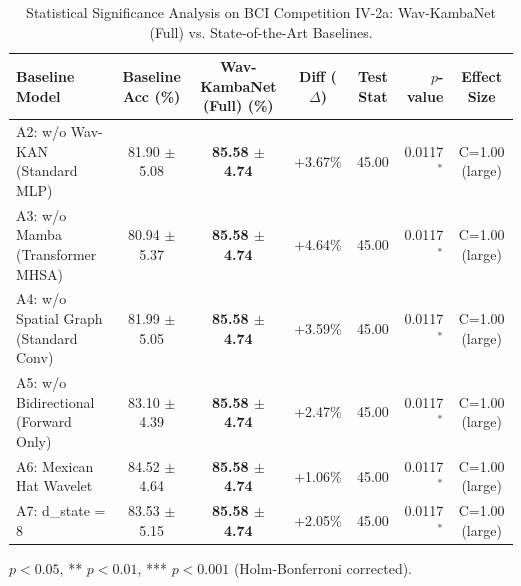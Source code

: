 \begin{table}[t]
\centering
\small
\caption{Statistical Significance Analysis on BCI Competition IV-2a: Wav-KambaNet (Full) vs. State-of-the-Art Baselines.}
\label{tab:stat_analysis}
\begin{tabular}{lccccrc}
\toprule
\textbf{Baseline Model} & \textbf{Baseline Acc (\%)} & \textbf{Wav-KambaNet (Full) (\%)} & \textbf{Diff ($\Delta$)} & \textbf{Test Stat} & \textbf{$p$-value} & \textbf{Effect Size} \\
\midrule
A2: w/o Wav-KAN (Standard MLP) & 81.90 $\pm$ 5.08 & \textbf{85.58 $\pm$ 4.74} & +3.67\% & 45.00 & 0.0117$^{*}$ & C=1.00 (large) \\
A3: w/o Mamba (Transformer MHSA) & 80.94 $\pm$ 5.37 & \textbf{85.58 $\pm$ 4.74} & +4.64\% & 45.00 & 0.0117$^{*}$ & C=1.00 (large) \\
A4: w/o Spatial Graph (Standard Conv) & 81.99 $\pm$ 5.05 & \textbf{85.58 $\pm$ 4.74} & +3.59\% & 45.00 & 0.0117$^{*}$ & C=1.00 (large) \\
A5: w/o Bidirectional (Forward Only) & 83.10 $\pm$ 4.39 & \textbf{85.58 $\pm$ 4.74} & +2.47\% & 45.00 & 0.0117$^{*}$ & C=1.00 (large) \\
A6: Mexican Hat Wavelet & 84.52 $\pm$ 4.64 & \textbf{85.58 $\pm$ 4.74} & +1.06\% & 45.00 & 0.0117$^{*}$ & C=1.00 (large) \\
A7: d_state = 8 & 83.53 $\pm$ 5.15 & \textbf{85.58 $\pm$ 4.74} & +2.05\% & 45.00 & 0.0117$^{*}$ & C=1.00 (large) \\
\bottomrule
\end{tabular}
\vspace{1mm}
\raggedright{\footnotesize * $p < 0.05$, ** $p < 0.01$, *** $p < 0.001$ (Holm-Bonferroni corrected).}
\end{table}